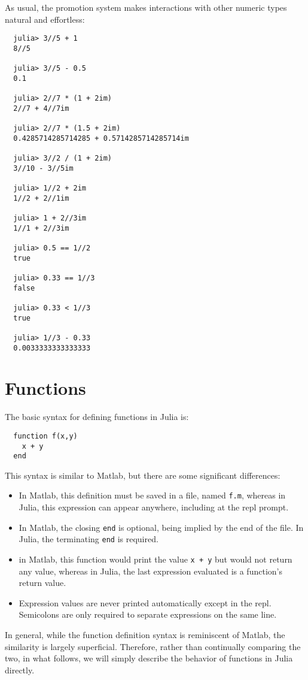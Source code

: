 \documentclass{article}
\renewcommand{\sec}[1]{\label{sec:#1}}
\begin{document}
As usual, the promotion system makes interactions with other numeric types natural and effortless:
\begin{verbatim}
  julia> 3//5 + 1
  8//5

  julia> 3//5 - 0.5
  0.1

  julia> 2//7 * (1 + 2im)
  2//7 + 4//7im

  julia> 2//7 * (1.5 + 2im)
  0.4285714285714285 + 0.5714285714285714im

  julia> 3//2 / (1 + 2im)
  3//10 - 3//5im

  julia> 1//2 + 2im
  1//2 + 2//1im

  julia> 1 + 2//3im
  1//1 + 2//3im

  julia> 0.5 == 1//2
  true

  julia> 0.33 == 1//3
  false

  julia> 0.33 < 1//3
  true

  julia> 1//3 - 0.33
  0.0033333333333333
\end{verbatim}

\section{Functions}\sec{functions}

The basic syntax for defining functions in Julia is:
\begin{verbatim}
  function f(x,y)
    x + y
  end
\end{verbatim}
This syntax is similar to Matlab, but there are some significant differences:
\begin{itemize}
\item In Matlab, this definition must be saved in a file, named \verb|f.m|, whereas in Julia, this expression can appear anywhere, including at the repl prompt.
\item In Matlab, the closing \verb|end| is optional, being implied by the end of the file.
In Julia, the terminating \verb|end| is required.
\item in Matlab, this function would print the value \verb|x + y| but would not return any value, whereas in Julia, the last expression evaluated is a function's return value.
\item Expression values are never printed automatically except in the repl.
Semicolons are only required to separate expressions on the same line.
\end{itemize}
In general, while the function definition syntax is reminiscent of Matlab, the similarity is largely superficial.
Therefore, rather than continually comparing the two, in what follows, we will simply describe the behavior of functions in Julia directly.
\end{document}
